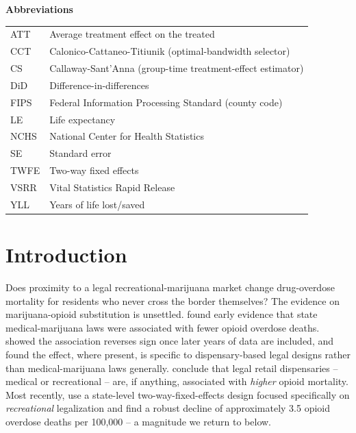 \documentclass[11pt]{article}
\begin{document}
\begin{titlepage}
\vfill
\noindent\textbf{Abbreviations} \\[2pt]
\noindent
\begin{tabular}{@{}ll@{}}
ATT    & Average treatment effect on the treated \\
CCT    & Calonico-Cattaneo-Titiunik (optimal-bandwidth selector) \\
CS     & Callaway-Sant'Anna (group-time treatment-effect estimator) \\
DiD    & Difference-in-differences \\
FIPS   & Federal Information Processing Standard (county code) \\
LE     & Life expectancy \\
NCHS   & National Center for Health Statistics \\
SE     & Standard error \\
TWFE   & Two-way fixed effects \\
VSRR   & Vital Statistics Rapid Release \\
YLL    & Years of life lost/saved \\
\end{tabular}

\vspace{0.5cm}
\end{titlepage}

\section{Introduction}

Does proximity to a legal recreational-marijuana market change
drug-overdose mortality for residents who never cross the border
themselves? The evidence on marijuana-opioid substitution is
unsettled. \citet{Bachhuber2014} found early evidence that state
medical-marijuana laws were associated with fewer opioid overdose
deaths. \citet{Shover2019} showed the association reverses sign once
later years of data are included, and \citet{PowellPaculaJacobson2018}
found the effect, where present, is specific to dispensary-based legal
designs rather than medical-marijuana laws generally.
\citet{MathurRuhm2022} conclude that legal retail dispensaries --
medical or recreational -- are, if anything, associated with
\emph{higher} opioid mortality. Most recently, \citet{Denkyirah2026}
use a state-level two-way-fixed-effects design focused specifically on
\emph{recreational} legalization and find a robust decline of
approximately 3.5 opioid overdose deaths per 100,000 -- a magnitude we
return to below.
\end{document}
